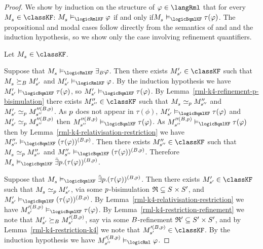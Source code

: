 \begin{proof}
We show by induction on the structure of $\phi \in \langRml$ that for every $\kPModel{\kStateS} \in \classKF$: $\kPModel{\kStateS} \entails_\logicRmlKF \phi$ if and only if$\kPModel{\kStateS} \entails_\logicBqmlKF \tau(\phi)$.
The propositional and modal cases follow directly from the semantics of \logicRmlKF{} and \logicBqmlKF{} and the induction hypothesis, so we show only the case involving refinement quantifiers.

Let $\kPModel{\kStateS} \in \classKF$.

Suppose that $\kPModel{\kStateS} \entails_\logicRmlKF \somerefsBs \phi$.
Then there exists $\kPModelP{\kStateSP} \in \classKF$ such that $\kPModel{\kStateS} \simulatesBs \kPModelP{\kStateSP}$ and $\kPModelP{\kStateSP} \entails_\logicRmlKF \phi$.
By the induction hypothesis we have $\kPModelP{\kStateSP} \entails_\logicBqmlKF \tau(\phi)$, so $\kPModelP{\kStateSP} \entails_\logicBqmlKF \tau(\phi)$.
By Lemma~\ref{rml-k4-refinement-p-bisimulation} there exists $\kPModelPP{\kStateSPP} \in \classKF$ such that $\kPModel{\kStateS} \bisimilar[\atomP] \kPModelPP{\kStateSPP}$ and $\kPModelP{\kStateSP} \bisimilar[\atomP] \kPModel[\prime\prime(\agentsB, \atomP)]{\kStateSPP}$.
As $\atomP$ does not appear in $\tau(\phi)$, $\kPModelP{\kStateSP} \entails_\logicBqmlKF \tau(\phi)$ and $\kPModelP{\kStateSP} \bisimilar[\atomP] \kPModel[\prime\prime(\agentsB, \atomP)]{\kStateSPP}$ then $\kPModel[\prime\prime(\agentsB, \atomP)]{\kStateSPP} \entails_\logicBqmlKF \tau(\phi)$.
As $\kPModel[\prime\prime(\agentsB, \atomP)]{\kStateSPP} \entails_\logicBqmlKF \tau(\phi)$ then by Lemma~\ref{rml-k4-relativisation-restriction} we have $\kPModelPP{\kStateSPP} \entails_\logicBqmlKF (\tau(\phi))^{(\agentsB, \atomP)}$.
Then there exists $\kPModelPP{\kStateSPP} \in \classKF$ such that $\kPModel{\kStateS} \bisimilar[\atomP] \kPModelPP{\kStateSPP}$ and $\kPModelPP{\kStateSPP} \entails_\logicBqmlKF (\tau(\phi))^{(\agentsB, \atomP)}$.
Therefore $\kPModel{\kStateS} \entails_\logicBqmlKF \somebisimsP (\tau(\phi))^{(\agentsB, \atomP)}$.

Suppose that $\kPModel{\kStateS} \entails_\logicBqmlKF \somebisimsP (\tau(\phi))^{(\agentsB, \atomP)}$.
Then there exists $\kPModelP{\kStateSP} \in \classKF$ such that $\kPModel{\kStateS} \bisimilar[\atomP] \kPModelP{\kStateSP}$, via some $\atomP$-bisimulation $\bisimulation \subseteq \kStates \times \kStatesP$, and $\kPModelP{\kStateSP} \entails_\logicBqmlKF (\tau(\phi))^{(\agentsB, \atomP)}$.
By Lemma~\ref{rml-k4-relativisation-restriction} we have $\kPModel[\prime(\agentsB, \atomP)]{\kStateSP} \entails_\logicBqmlKF \tau(\phi)$.
By Lemma~\ref{rml-k4-restriction-refinement} we note that $\kPModelP{\kStateSP} \simulatesBs \kPModel[\prime(\agentsB, \atomP)]{\kStateSP}$, say via some $\agentsB$-refinement $\refinement' \subseteq \kStatesP \times \kStatesP$, and by Lemma~\ref{rml-k4-restriction-k4} we note that $\kPModel[\prime(\agentsB, \atomP)]{\kStateSP} \in \classKF$.
By the induction hypothesis we have $\kPModel[\prime(\agentsB, \atomP)]{\kStateSPP} \entails_\logicRml \phi$.


\end{proof}
